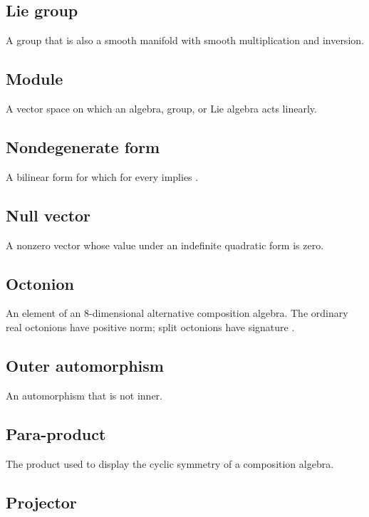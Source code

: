 \documentclass[11pt]{article}
\begin{document}
\subsection{Lie group}

A group that is also a smooth manifold with smooth multiplication and inversion.

\subsection{Module}

A vector space on which an algebra, group, or Lie algebra acts linearly.

\subsection{Nondegenerate form}

A bilinear form for which \texttt{} for every \texttt{} implies \texttt{}.

\subsection{Null vector}

A nonzero vector whose value under an indefinite quadratic form is zero.

\subsection{Octonion}

An element of an 8-dimensional alternative composition algebra. The ordinary real octonions have positive norm; split octonions have signature \texttt{}.

\subsection{Outer automorphism}

An automorphism that is not inner.

\subsection{Para-product}

The product \texttt{} used to display the cyclic symmetry of a composition algebra.

\subsection{Projector}
\end{document}
